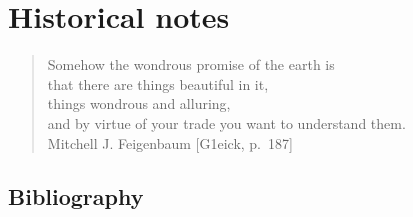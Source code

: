 

\chapter{Historical notes}
\label{c-history}

\begin{quote}
Somehow the wondrous promise of the earth is \\
that there are things beautiful in  it, \\
things wondrous and alluring, \\
and by virtue of your trade you want to understand them. \\
Mitchell J.  Feigenbaum [G1eick, p.~187]
\end{quote}

\section{Bibliography}
\label{sect:Others}

